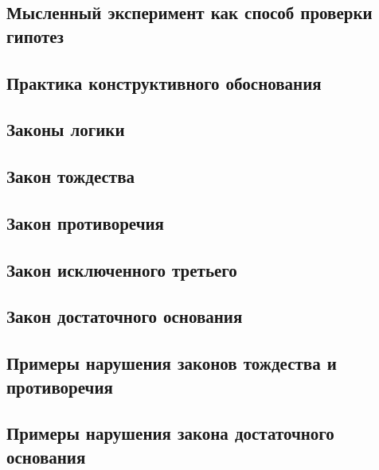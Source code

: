 \documentclass[main.tex]{subfiles}
\begin{document}
\subsection{Мысленный эксперимент как способ проверки гипотез}


\subsection{Практика конструктивного обоснования}


\subsection{Законы логики}


\subsection{Закон тождества}


\subsection{Закон противоречия}


\subsection{Закон исключенного третьего}


\subsection{Закон достаточного основания}



\subsection{Примеры нарушения законов тождества и противоречия}


\subsection{Примеры нарушения закона достаточного основания}
\end{document}
